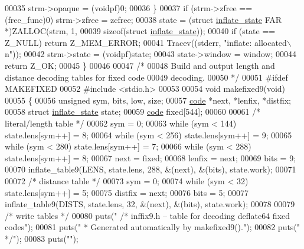 \begin{DoxyCode}
00035         strm->opaque = (voidpf)0;
00036     \}
00037     \textcolor{keywordflow}{if} (strm->zfree == (free\_func)0) strm->zfree = zcfree;
00038     state = (\textcolor{keyword}{struct} \hyperlink{structinflate__state}{inflate\_state} FAR *)ZALLOC(strm, 1,
00039                                                \textcolor{keyword}{sizeof}(\textcolor{keyword}{struct} \hyperlink{structinflate__state}{inflate\_state}));
00040     \textcolor{keywordflow}{if} (state == Z\_NULL) \textcolor{keywordflow}{return} Z\_MEM\_ERROR;
00041     Tracev((stderr, \textcolor{stringliteral}{"inflate: allocated\(\backslash\)n"}));
00042     strm->state = (voidpf)state;
00043     state->window = window;
00044     \textcolor{keywordflow}{return} Z\_OK;
00045 \}
00046 
00047 \textcolor{comment}{/*}
00048 \textcolor{comment}{   Build and output length and distance decoding tables for fixed code}
00049 \textcolor{comment}{   decoding.}
00050 \textcolor{comment}{ */}
00051 \textcolor{preprocessor}{#ifdef MAKEFIXED}
00052 \textcolor{preprocessor}{#include <stdio.h>}
00053 
00054 \textcolor{keywordtype}{void} makefixed9(\textcolor{keywordtype}{void})
00055 \{
00056     \textcolor{keywordtype}{unsigned} sym, bits, low, size;
00057     \hyperlink{structcode}{code} *next, *lenfix, *distfix;
00058     \textcolor{keyword}{struct }\hyperlink{structinflate__state}{inflate\_state} state;
00059     \hyperlink{structcode}{code} fixed[544];
00060 
00061     \textcolor{comment}{/* literal/length table */}
00062     sym = 0;
00063     \textcolor{keywordflow}{while} (sym < 144) state.lens[sym++] = 8;
00064     \textcolor{keywordflow}{while} (sym < 256) state.lens[sym++] = 9;
00065     \textcolor{keywordflow}{while} (sym < 280) state.lens[sym++] = 7;
00066     \textcolor{keywordflow}{while} (sym < 288) state.lens[sym++] = 8;
00067     next = fixed;
00068     lenfix = next;
00069     bits = 9;
00070     inflate\_table9(LENS, state.lens, 288, &(next), &(bits), state.work);
00071 
00072     \textcolor{comment}{/* distance table */}
00073     sym = 0;
00074     \textcolor{keywordflow}{while} (sym < 32) state.lens[sym++] = 5;
00075     distfix = next;
00076     bits = 5;
00077     inflate\_table9(DISTS, state.lens, 32, &(next), &(bits), state.work);
00078 
00079     \textcolor{comment}{/* write tables */}
00080     puts(\textcolor{stringliteral}{"    /* inffix9.h -- table for decoding deflate64 fixed codes"});
00081     puts(\textcolor{stringliteral}{"     * Generated automatically by makefixed9()."});
00082     puts(\textcolor{stringliteral}{"     */"});
00083     puts(\textcolor{stringliteral}{""});

\end{DoxyCode}
